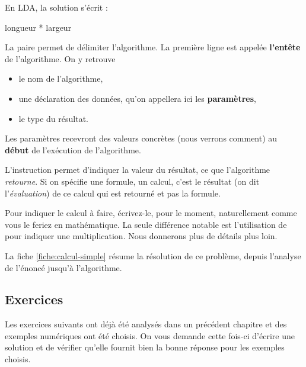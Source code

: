 		En LDA, la solution s'écrit :
		
		\begin{LDA}
				\Return longueur * largeur
			\EndAlgo
		\end{LDA}
	
		La paire \lda{\algorithmicalgo-\algorithmicend\ \algorithmicalgo}
		permet de délimiter l'algorithme.
		La première ligne est appelée 
		\textbf{l'entête} de l'algorithme.
		On y retrouve 
		\begin{itemize}
			\item 
				le nom de l'algorithme,
			\item 
				une déclaration des données, 
				qu’on appellera ici les \textbf{paramètres}, 
			\item 
				le type du résultat.
		\end{itemize}
	
		Les paramètres recevront des valeurs concrètes
		(nous verrons comment)
		au \textbf{début} de l’exécution de l'algorithme. 
	
		L'instruction \lda{\algorithmicreturn}
		permet d'indiquer la valeur du résultat, 
		ce que l'algorithme \emph{retourne}.
		Si on spécifie une formule, un calcul,
		c'est le résultat (on dit l'\emph{évaluation}) 
		de ce calcul qui est retourné et pas la formule.
	
		Pour indiquer le calcul à faire,
		écrivez-le, pour le moment,
		naturellement comme vous le feriez en mathématique.
		La seule différence notable est l'utilisation de \lda{*}
		pour indiquer une multiplication.
		Nous donnerons plus de détails plus loin.
	
		La fiche \vref{fiche:calcul-simple} résume la résolution
		de ce problème, depuis l'analyse de l'énoncé jusqu'à l'algorithme.
	
		\subsection{Exercices}\label{prem-ex-simple}
	
			Les exercices suivants ont déjà été analysés 
			dans un précédent chapitre
			et des exemples numériques ont été choisis.
			On vous demande cette fois-ci d'écrire une solution
			et de vérifier qu'elle fournit bien la bonne
			réponse pour les exemples choisis.
		
